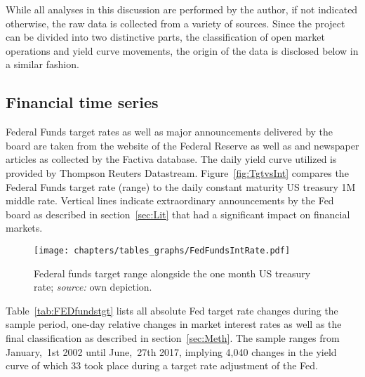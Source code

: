
While all analyses in this discussion are performed by the author, if not indicated otherwise, the raw data is collected from a variety of sources. Since the project can be divided into two distinctive parts, the classification of open market operations and yield curve movements, the origin of the data is disclosed below in a similar fashion.

\subsection{Financial time series}
Federal Funds target rates as well as major announcements delivered by the board are taken from the website of the Federal Reserve \parencite{Fed.OMOs} as well as \textcite{Fawley.2013} and newspaper articles as collected by the Factiva database. The daily yield curve utilized is provided by Thompson Reuters Datastream. Figure~\vref{fig:TgtvsInt} compares the Federal Funds target rate (range) to the daily constant maturity US treasury 1M middle rate. Vertical lines indicate extraordinary announcements by the Fed board as described in section~\ref{sec:Lit} that had a significant impact on financial markets.

\begin{figure}[htbp]
	\centering
		\texttt{[image: chapters/tables\_graphs/FedFundsIntRate.pdf]} 
	\caption[Federal funds target range alongside the one month US treasury rate.]{Federal funds target range alongside the one month US treasury rate; \textit{source:} own depiction.}
\label{fig:TgtvsInt}
\end{figure}
%
Table~\vref{tab:FEDfundstgt} lists all absolute Fed target rate changes during the sample period, one-day relative changes in market interest rates as well as the final classification as described in section~\ref{sec:Meth}. The sample ranges from January,~1st 2002 until June,~27th 2017, implying 4,040 changes in the yield curve of which 33 took place during a target rate adjustment of the Fed. 
%

%

